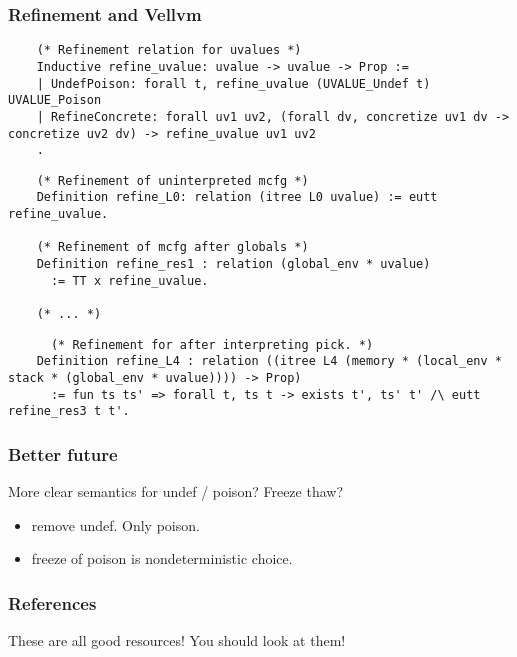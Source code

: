 \documentclass{beamer}
\begin{document}
\begin{frame}[fragile]
  \frametitle{Refinement and Vellvm}

\begin{lstlisting}
    (* Refinement relation for uvalues *)
    Inductive refine_uvalue: uvalue -> uvalue -> Prop :=
    | UndefPoison: forall t, refine_uvalue (UVALUE_Undef t) UVALUE_Poison
    | RefineConcrete: forall uv1 uv2, (forall dv, concretize uv1 dv -> concretize uv2 dv) -> refine_uvalue uv1 uv2
    .
\end{lstlisting}

  \pause
  
\begin{lstlisting}
    (* Refinement of uninterpreted mcfg *)
    Definition refine_L0: relation (itree L0 uvalue) := eutt refine_uvalue.

    (* Refinement of mcfg after globals *)
    Definition refine_res1 : relation (global_env * uvalue)
      := TT x refine_uvalue.

    (* ... *)
\end{lstlisting}

  \pause

\begin{lstlisting}
      (* Refinement for after interpreting pick. *)
    Definition refine_L4 : relation ((itree L4 (memory * (local_env * stack * (global_env * uvalue)))) -> Prop)
      := fun ts ts' => forall t, ts t -> exists t', ts' t' /\ eutt refine_res3 t t'.
\end{lstlisting}

\end{frame}

\begin{frame}
  \frametitle{Better future}

  More clear semantics for undef / poison? Freeze thaw?

  \begin{itemize}
  \item remove undef. Only poison.
  \item freeze of poison is nondeterministic choice.
  \end{itemize}
\end{frame}

  \begin{frame}
    \frametitle{References}

  \nocite{*}
  \printbibliography

  These are all good resources! You should look at them!
\end{frame}
\end{document}
